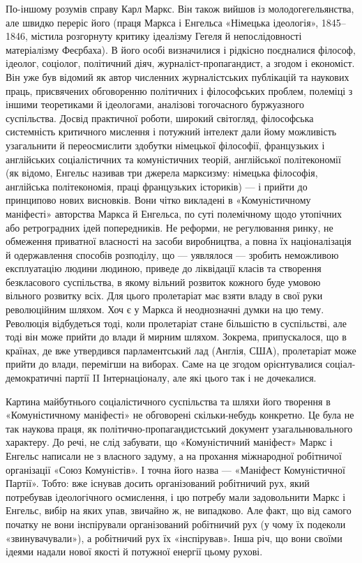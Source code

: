 По-іншому розумів справу Карл Маркс. Він також вийшов із 
молодогегельянства, але швидко переріс його (праця Маркса і Енгельса 
«Німецька ідеологія», 1845--1846, містила розгорнуту критику ідеалізму 
Гегеля й непослідовності матеріалізму Феєрбаха). В його особі 
визначилися і рідкісно поєдналися філософ, ідеолог, соціолог, 
політичний діяч, журналіст-пропагандист, а згодом і економіст. Він уже 
був відомий як автор численних журналістських публікацій та наукових 
праць, присвячених обговоренню політичних і філософських проблем, 
полеміці з іншими теоретиками й ідеологами, аналізові тогочасного 
буржуазного суспільства. Досвід практичної роботи, широкий світогляд, 
філософська системність критичного мислення і потужний інтелект дали 
йому можливість узагальнити й переосмислити здобутки німецької 
філософії, французьких і англійських соціалістичних та комуністичних 
теорій, англійської політекономії (як відомо, Енгельс називав три 
джерела марксизму: німецька філософія, англійська політекономія, 
праці французьких істориків) — і прийти до принципово нових 
висновків. Вони чітко викладені в «Комуністичному маніфесті» 
авторства Маркса й Енгельса, по суті полемічному щодо утопічних або 
ретроградних ідей попередників. Не реформи, не регулювання ринку, не 
обмеження приватної власності на засоби виробництва, а повна їх 
націоналізація й одержавлення способів розподілу, що — уявлялося — 
зробить неможливою експлуатацію людини людиною, приведе до 
ліквідації класів та створення безкласового суспільства, в якому 
вільний розвиток кожного буде умовою вільного розвитку всіх. Для 
цього пролетаріат має взяти владу в свої руки революційним шляхом. Хоч 
є у Маркса й неоднозначні думки на цю тему. Революція відбудеться тоді, 
коли пролетаріат стане більшістю в суспільстві, але тоді він може 
прийти до влади й мирним шляхом. Зокрема, припускалося, що в країнах, де 
вже утвердився парламентський лад (Англія, США), пролетаріат може 
прийти до влади, перемігши на виборах. Саме на це згодом орієнтувалися 
соціал-демократичні партії II Інтернаціоналу, але які цього так і не 
дочекалися.


Картина майбутнього соціалістичного суспільства та шляхи його 
творення в «Комуністичному маніфесті» не обговорені скільки-небудь 
конкретно. Це була не так наукова праця, як 
політично-пропагандистський документ узагальнювального характеру. 
До речі, не слід забувати, що «Комуністичний маніфест» Маркс і Енгельс 
написали не з власного задуму, а на прохання міжнародної робітничої 
організації «Союз Комуністів». І точна його назва —  «Маніфест 
Комуністичної Партії». Тобто: вже існував досить організований 
робітничий рух, який потребував ідеологічного осмислення, і цю 
потребу мали задовольнити Маркс і Енгельс, вибір на яких упав, 
звичайно ж, не випадково. Але факт, що від самого початку не вони 
інспірували організований робітничий рух (у чому їх подеколи 
«звинувачували»), а робітничий рух їх «інспірував». Інша річ, що вони 
своїми ідеями надали нової якості й потужної енергії цьому рухові. 


